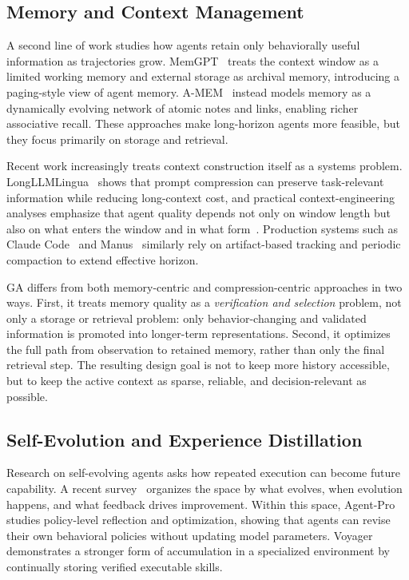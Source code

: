 \subsection{Memory and Context Management}
\label{sec:related_memory}

A second line of work studies how agents retain only behaviorally useful information as trajectories grow. MemGPT~\citep{memgpt} treats the context window as a limited working memory and external storage as archival memory, introducing a paging-style view of agent memory. A-MEM~\citep{amem} instead models memory as a dynamically evolving network of atomic notes and links, enabling richer associative recall. These approaches make long-horizon agents more feasible, but they focus primarily on storage and retrieval.

Recent work increasingly treats context construction itself as a systems problem. LongLLMLingua~\citep{longllmlingua} shows that prompt compression can preserve task-relevant information while reducing long-context cost, and practical context-engineering analyses emphasize that agent quality depends not only on window length but also on what enters the window and in what form~\citep{anthropic_context}. Production systems such as Claude Code~\citep{claudecode} and Manus~\citep{manus} similarly rely on artifact-based tracking and periodic compaction to extend effective horizon.

GA differs from both memory-centric and compression-centric approaches in two ways. First, it treats memory quality as a \emph{verification and selection} problem, not only a storage or retrieval problem: only behavior-changing and validated information is promoted into longer-term representations. Second, it optimizes the full path from observation to retained memory, rather than only the final retrieval step. The resulting design goal is not to keep more history accessible, but to keep the active context as sparse, reliable, and decision-relevant as possible.

\subsection{Self-Evolution and Experience Distillation}
\label{sec:related_self_evolution}

Research on self-evolving agents asks how repeated execution can become future capability. A recent survey~\citep{selfevolvesurvey} organizes the space by what evolves, when evolution happens, and what feedback drives improvement. Within this space, Agent-Pro~\citep{agentpro} studies policy-level reflection and optimization, showing that agents can revise their own behavioral policies without updating model parameters. Voyager~\citep{voyager} demonstrates a stronger form of accumulation in a specialized environment by continually storing verified executable skills.

